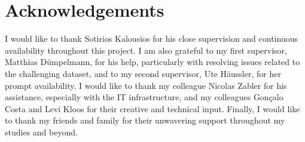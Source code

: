 \chapter*{Acknowledgements}

I would like to thank Sotirios Kalousios for his close supervision and continuous availability throughout this project.
I am also grateful to my first supervisor, Matthias Dümpelmann, for his help, particularly with resolving issues related to the challenging dataset, and to my second supervisor, Ute Häussler, for her prompt availability.
I would like to thank my colleague Nicolas Zabler for his assistance, especially with the IT infrastructure, and my colleagues Gonçalo Costa and Levi Kloos for their creative and technical input.
Finally, I would like to thank my friends and family for their unwavering support throughout my studies and beyond.